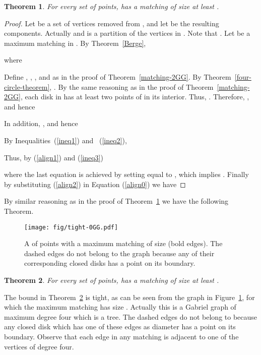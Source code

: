 \documentclass[11pt,a4paper]{article}
\newcommand{\kGG}[2]{}
\newtheorem{theorem}{Theorem}
\begin{document}
\begin{theorem}
\label{matching-1GG}
For every set  of  points, \kGG{1}{} has a matching of size at least .
\end{theorem}

\begin{proof}
Let  be a set of  vertices removed from \kGG{1}{}, and let  be the resulting  components. Actually  and  is a partition of the vertices in . Note that .
Let  be a maximum matching in \kGG{1}{}. By Theorem~\ref{Berge}, 



where


Define , , , and  as in the proof of Theorem~\ref{matching-2GG}. By Theorem~\ref{four-circle-theorem}, .
By the same reasoning as in the proof of Theorem~\ref{matching-2GG}, each disk in  has at least two points of  in its interior. Thus, . Therefore, , and hence

 

In addition, , and hence



By Inequalities~(\ref{ineq1}) and ~(\ref{ineq2}), 



Thus, by (\ref{align1}) and (\ref{ineq3})



where the last equation is achieved by setting  equal to , which implies . Finally by substituting (\ref{align2}) in Equation (\ref{align0}) we have

\end{proof}

By similar reasoning as in the proof of Theorem~\ref{matching-1GG} we have the following Theorem.

\begin{figure}[htb]
  \centering
  \texttt{[image: fig/tight-0GG.pdf]}
 \caption{A \kGG{0}{} of   points with a maximum matching of size  (bold edges). The dashed edges do not belong to the graph because any of their corresponding closed disks has a point on its boundary.}
  \label{tight-0GG}
\end{figure}

\begin{theorem}
\label{matching-0GG}
For every set  of  points, \kGG{0}{} has a matching of size at least .
\end{theorem}

The bound in Theorem~\ref{matching-0GG} is tight, as can be seen from the graph in Figure~\ref{tight-0GG}, for which the maximum matching has size . Actually this is a Gabriel graph of maximum degree four which is a tree. The dashed edges do not belong to \kGG{0}{} because any closed disk which has one of these edges as diameter has a point on its boundary. Observe that each edge in any matching is adjacent to one of the vertices of degree four.
\end{document}
